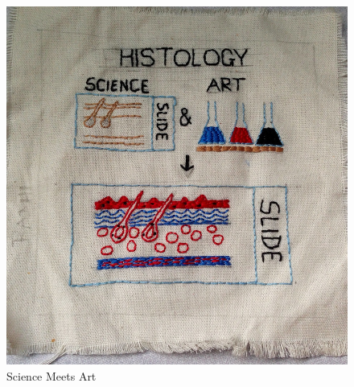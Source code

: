 \message{ !name(presentation.tex)}\documentclass[usenames,dvipsnames]{beamer}
\begin{document}
\begin{frame}
\begin{columns}[t]
\begin{column}{.48\textwidth}
\begin{figure}[ht]
        \includegraphics[width=1.0\textwidth,keepaspectratio]{figures/histology_art.jpg}
        \caption*{Science Meets Art\label{fig:histology-art}}
      \end{figure}
    \end{column}
  \end{columns}
\end{frame}
\end{document}
